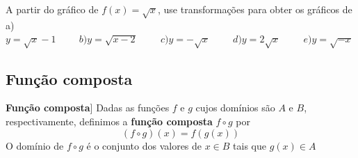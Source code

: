 
\begin{exe} A partir do gráfico de $f(x)= \sqrt{x}$, use transformações para obter os gráficos de  \\
a)$y=\sqrt{x}-1 \hspace{1cm} b) y=\sqrt{x-2} \hspace{1cm} c) y=- \sqrt{x} \hspace{1cm} d)y=2\sqrt{x} \hspace{1cm} e)y= \sqrt{-x}$
\end{exe}
\vspace{7cm}
\subsection{Função composta}

\begin{defin} \label{com}\textbf{Função composta}] Dadas as funções $f $ e $ g$ cujos domínios são $A$ e $B$, respectivamente, definimos a \textbf{função composta} $f \circ g$ por
$$(f \circ g)(x)= f(g(x))$$
O domínio de $f \circ g$ é o conjunto dos valores de $x \in B$ tais que $g(x) \in A$
\end{defin}

